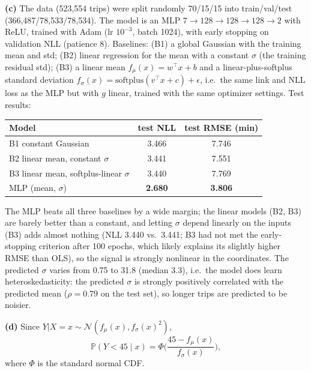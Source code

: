 \documentclass{article}
\begin{document}
\begin{solution}[]
  \textbf{(c)} The data (523{,}554 trips) were split randomly 70/15/15 into train/val/test (366{,}487/78{,}533/78{,}534). The model is an MLP $7\to128\to128\to128\to2$ with ReLU, trained with Adam (lr $10^{-3}$, batch 1024), with early stopping on validation NLL (patience 8). Baselines: (B1) a global Gaussian with the training mean and std; (B2) linear regression for the mean with a constant $\sigma$ (the training residual std); (B3) a linear mean $f_\mu(x)=w^\top x+b$ and a linear-plus-softplus standard deviation $f_\sigma(x)=\mathrm{softplus}(v^\top x+c)+\epsilon$, i.e.\ the same link and NLL loss as the MLP but with $g$ linear, trained with the same optimizer settings. Test results:
  \begin{center}
    \begin{tabular}{lcc}
      Model & test NLL & test RMSE (min) \\ \hline
      B1 constant Gaussian & 3.466 & 7.746 \\
      B2 linear mean, constant $\sigma$ & 3.441 & 7.551 \\
      B3 linear mean, softplus-linear $\sigma$ & 3.440 & 7.769 \\
      MLP (mean, $\sigma$) & \textbf{2.680} & \textbf{3.806}
    \end{tabular}
  \end{center}
  The MLP beats all three baselines by a wide margin; the linear models (B2, B3) are barely better than a constant, and letting $\sigma$ depend linearly on the inputs (B3) adds almost nothing (NLL 3.440 vs.\ 3.441; B3 had not met the early-stopping criterion after 100 epochs, which likely explains its slightly higher RMSE than OLS), so the signal is strongly nonlinear in the coordinates. The predicted $\sigma$ varies from 0.75 to 31.8 (median 3.3), i.e.\ the model does learn heteroskedasticity: the predicted $\sigma$ is strongly positively correlated with the predicted mean ($\rho=0.79$ on the test set), so longer trips are predicted to be noisier.

  \textbf{(d)} Since $Y|X=x\sim\mathcal N(f_\mu(x),f_\sigma(x)^2)$,
  \[
    \mathbb P(Y<45\mid x)=\Phi\!\Big(\frac{45-f_\mu(x)}{f_\sigma(x)}\Big),
  \]
  where $\Phi$ is the standard normal CDF.


\end{solution}
\end{document}
